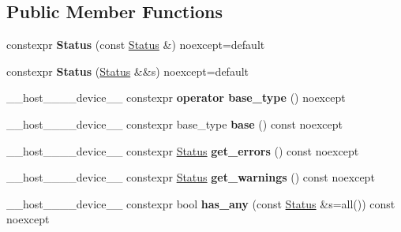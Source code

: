 \subsection*{Public Member Functions}
\begin{DoxyCompactItemize}
\item 
\mbox{\label{classwarpcore_1_1Status_a27b4acace2406734dcdf5ce4e1e6af71}} 
constexpr {\bfseries Status} (const \hyperlink{classwarpcore_1_1Status}{Status} \&) noexcept=default
\item 
\mbox{\label{classwarpcore_1_1Status_a9246cd59682078466195e75d44e20aaf}} 
constexpr {\bfseries Status} (\hyperlink{classwarpcore_1_1Status}{Status} \&\&s) noexcept=default
\item 
\mbox{\label{classwarpcore_1_1Status_affd3effa31a4a85104b691c5d074e0e8}} 
\+\_\+\+\_\+host\+\_\+\+\_\+\+\_\+\+\_\+device\+\_\+\+\_\+ constexpr {\bfseries operator base\+\_\+type} () noexcept
\item 
\mbox{\label{classwarpcore_1_1Status_ae52d09de9f4d0edc1a82dd9abe949c05}} 
\+\_\+\+\_\+host\+\_\+\+\_\+\+\_\+\+\_\+device\+\_\+\+\_\+ constexpr base\+\_\+type {\bfseries base} () const noexcept
\item 
\mbox{\label{classwarpcore_1_1Status_a322505a0bfd8a482485c3637a0a67031}} 
\+\_\+\+\_\+host\+\_\+\+\_\+\+\_\+\+\_\+device\+\_\+\+\_\+ constexpr \hyperlink{classwarpcore_1_1Status}{Status} {\bfseries get\+\_\+errors} () const noexcept
\item 
\mbox{\label{classwarpcore_1_1Status_af853b0bcdde437fccac72e57e1a93779}} 
\+\_\+\+\_\+host\+\_\+\+\_\+\+\_\+\+\_\+device\+\_\+\+\_\+ constexpr \hyperlink{classwarpcore_1_1Status}{Status} {\bfseries get\+\_\+warnings} () const noexcept
\item 
\mbox{\label{classwarpcore_1_1Status_a7c67c7914bad36717f100ed33e25baab}} 
\+\_\+\+\_\+host\+\_\+\+\_\+\+\_\+\+\_\+device\+\_\+\+\_\+ constexpr bool {\bfseries has\+\_\+any} (const \hyperlink{classwarpcore_1_1Status}{Status} \&s=all()) const noexcept
\item 
\mbox{\label{classwarpcore_1_1Status_a7e085f177677d05f544b57b5d597e653}} 

\end{DoxyCompactItemize}
